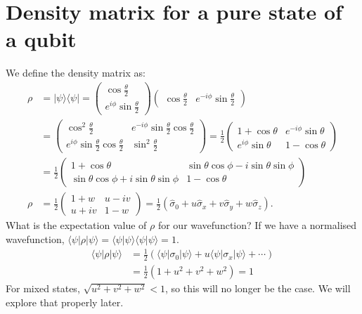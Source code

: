 \documentclass[lasers.tex]{subfiles}
\begin{document}
\section{Density matrix for a pure state of a qubit}
We define the density matrix as:
\begin{align}
    \rho &= |\psi\rangle\langle\psi| = \begin{pmatrix} \cos\frac{\theta}{2} \\ e^{i\phi}\sin\frac{\theta}{2}\end{pmatrix}\begin{pmatrix} \cos\frac{\theta}{2} & e^{-i\phi}\sin\frac{\theta}{2}\end{pmatrix}  \\
                                    &= \begin{pmatrix} \cos^2\frac{\theta}{2} & e^{-i\phi}\sin\frac{\theta}{2}\cos\frac{\theta}{2} \\ e^{i\phi}\sin\frac{\theta}{2}\cos\frac{\theta}{2} & \sin^2\frac{\theta}{2}\end{pmatrix} = \frac12 \begin{pmatrix} 1+\cos\theta & e^{-i\phi}\sin\theta \\ e^{i\phi}\sin\theta & 1-\cos\theta\end{pmatrix} \\
                                    &= \frac12 \begin{pmatrix} 1+\cos\theta & \sin\theta\cos\phi - i\sin\theta\sin\phi \\ \sin\theta\cos\phi + i\sin\theta\sin\phi & 1-\cos\theta\end{pmatrix} \\
    \rho &= \frac12\begin{pmatrix} 1+w & u-iv \\ u+iv & 1-w\end{pmatrix} = \frac12\left(\hat{\sigma}_0 + u\hat{\sigma}_x + v\hat{\sigma}_y + w\hat{\sigma}_z\right).
\end{align}
What is the expectation value of $\rho$ for our wavefunction?
If we have a normalised wavefunction, $\langle\psi|\rho|\psi\rangle = \langle\psi|\psi\rangle\langle\psi|\psi\rangle = 1$.
\begin{align}
    \langle\psi|\rho|\psi\rangle &= \frac12\left(\langle\psi|\sigma_0|\psi\rangle + u\langle\psi|\sigma_x|\psi\rangle + \cdots\right) \\
                                 &= \frac12\left(1 + u^2 + v^2 + w^2\right) = 1
\end{align}
For mixed states, $\sqrt{u^2+v^2+w^2}<1$, so this will no longer be the case. 
We will explore that properly later. 
\end{document}
